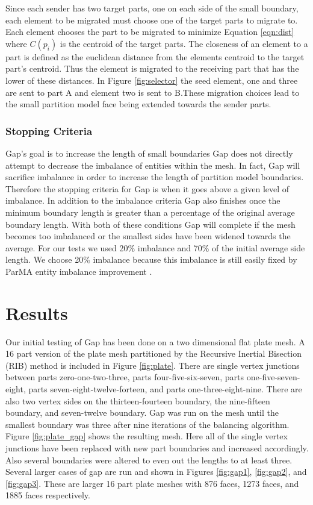 \documentclass{thesis}
\begin{document}
Since each sender has two target parts, one on each side of the small 
boundary, each element to be migrated must choose one of the target parts to 
migrate to. Each element chooses the part to be migrated to minimize Equation \ref{eqn:dist} where $C(p_i)$ is the centroid of the target parts. 
The closeness of an element to a part is defined as the euclidean distance 
from the elements centroid to the target part's centroid. Thus the element 
is migrated to the receiving part that has the lower of these distances. 
In Figure \ref{fig:selector} the seed element, one and three are sent to 
part A and element two is sent to B.These migration choices lead to the 
small partition model face being extended towards the sender parts. 


\subsection{Stopping Criteria}
Gap's goal is to increase the length of small boundaries
Gap does not directly attempt to decrease the imbalance of entities within 
the mesh. In fact, Gap will sacrifice imbalance in order to increase the 
length of partition model boundaries. Therefore the stopping criteria for Gap 
is when it goes above a given level of imbalance. In addition to the imbalance 
criteria Gap also finishes once the minimum boundary length is greater than 
a percentage of the original average boundary length. With both of these 
conditions Gap will complete if the mesh becomes too imbalanced or the 
smallest sides have been widened towards the average. For our tests we 
used 20\% imbalance and 70\% of the initial average side length. We choose 
20\% imbalance because this imbalance is still easily fixed by ParMA entity 
imbalance improvement \cite{parma,zhougraph,zhou2012}.

\chapter{Results}

Our initial testing of Gap has been done on a two dimensional flat plate mesh. 
A 16 part version of the plate mesh partitioned by  the Recursive Inertial 
Bisection (RIB) method \cite{williamsRIB,taylorRIB} is included in Figure 
\ref{fig:plate}. There are single vertex junctions between parts 
zero-one-two-three, 
parts four-five-six-seven, parts one-five-seven-eight, parts 
seven-eight-twelve-forteen, and parts one-three-eight-nine. There are 
also two vertex sides on the thirteen-fourteen boundary, the nine-fifteen 
boundary, and seven-twelve 
boundary. Gap was run on the mesh until the smallest boundary was three after 
nine 
iterations of the balancing algorithm. Figure \ref{fig:plate_gap} shows the 
resulting mesh. Here all of the single vertex junctions have been replaced with 
new part boundaries and increased accordingly. Also several boundaries were 
altered to even out the lengths to at least three. Several larger cases of gap are run and shown in Figures \ref{fig:gap1}, \ref{fig:gap2}, and \ref{fig:gap3}. These are larger 16 part plate meshes with 876 faces, 1273 faces, and 1885 faces respectively.  
\end{document}
